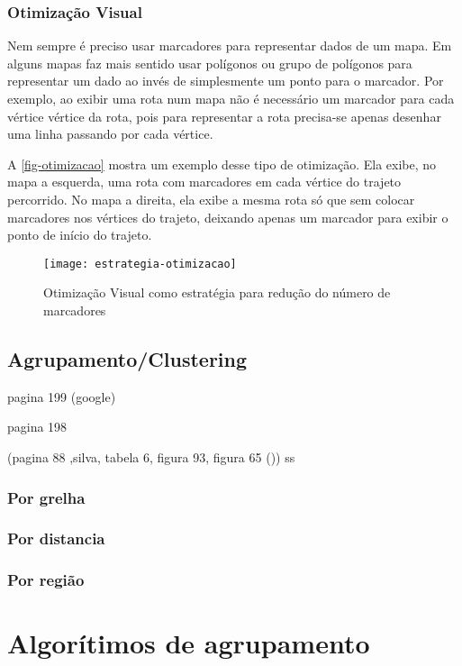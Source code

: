 	\subsubsection{Otimização Visual}
	Nem sempre é preciso usar marcadores para representar dados de um mapa. Em alguns mapas faz mais sentido usar polígonos ou grupo de polígonos para representar um dado ao invés de simplesmente um ponto para o marcador. Por exemplo, ao exibir uma rota  num mapa não é necessário um marcador para cada vértice vértice da rota, pois para representar a rota precisa-se apenas desenhar uma linha passando por cada vértice.
	
	A \autoref{fig-otimizacao} mostra um exemplo desse tipo de otimização. Ela exibe, no mapa a esquerda, uma rota com marcadores em cada vértice do trajeto percorrido. No mapa a direita, ela exibe a mesma rota só que sem colocar marcadores nos vértices do trajeto, deixando apenas um marcador para exibir o ponto de início do trajeto.
	
	 \begin{figure}[htb]
	\caption{\label{fig-otimizacao}Otimização Visual como estratégia para redução do número de marcadores}
	\begin{center}
	    \texttt{[image: estrategia-otimizacao]}
	\end{center}
	\end{figure}
	
	
	

  \subsection{Agrupamento/Clustering}
  pagina 199 (google)
  
  	 
 pagina 198

 
 (pagina 88 ,silva, tabela 6, figura 93, figura 65 ())
ss
		\subsubsection{Por grelha}
		\subsubsection{Por distancia}
		\subsubsection{Por região}
		
\section{Algorítimos de agrupamento}
